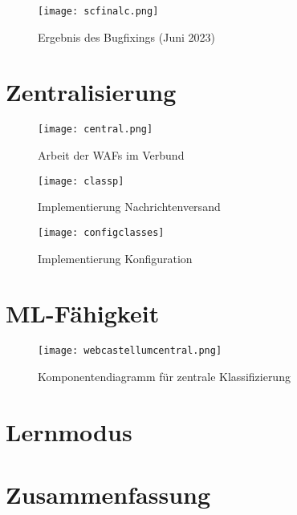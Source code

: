 \begin{figure}[h]
    \centering
    \texttt{[image: scfinalc.png]}
    \caption{Ergebnis des Bugfixings (Juni 2023)}
    \label{fig:my_sonarf}
\end{figure}


\section{Zentralisierung}
\begin{figure}[ht]
    \centering
    \texttt{[image: central.png]}
    \caption{Arbeit der WAFs im Verbund}
    \label{fig:my_verbund}
\end{figure}

\begin{figure}[h]
  \begin{center}
    \texttt{[image: classp]}
    \caption{Implementierung Nachrichtenversand}
    \label{fig.impversand}
  \end{center}
\end{figure}

\begin{figure}[h]
  \begin{center}
    \texttt{[image: configclasses]}
    \caption{Implementierung Konfiguration}
    \label{fig.impkonfig}
  \end{center}
\end{figure}



\section{ML-Fähigkeit}

\begin{figure}[h]
    \centering
    \texttt{[image: webcastellumcentral.png]}
    \caption{Komponentendiagramm für zentrale Klassifizierung}
    \label{fig:my_future}
\end{figure}

\section{Lernmodus}


\section{Zusammenfassung}

